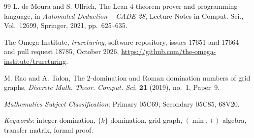 \documentclass[12pt]{article}
\theoremstyle{plain}
\theoremstyle{remark}
\begin{document}
\begin{thebibliography}{99}
L. de Moura and S. Ullrich, The Lean 4 theorem prover and programming language, in
\emph{Automated Deduction -- CADE 28}, Lecture Notes in Comput. Sci., Vol.~12699, Springer,
2021, pp.~625--635.

The Omega Institute, \emph{trureturing}, software repository, issues 17651 and 17664 and pull
request 18785, October 2026, \url{https://github.com/the-omega-institute/trureturing}.

M. Rao and A. Talon, The $2$-domination and Roman domination numbers of grid graphs,
\emph{Discrete Math. Theor. Comput. Sci.} \textbf{21} (2019), no.~1, Paper~9.

\end{thebibliography}

\bigskip
{} \emph{Mathematics Subject Classification}: Primary 05C69; Secondary 05C85, 68V20.

\noindent \emph{Keywords}: integer domination, $\{k\}$-domination, grid graph, $(\min,+)$
algebra, transfer matrix, formal proof.
\end{document}

